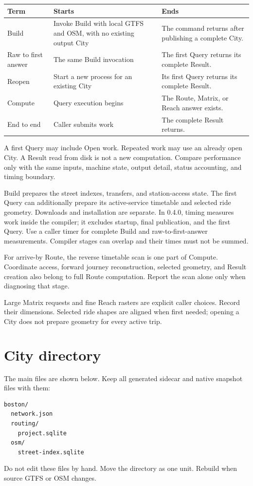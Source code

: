 \documentclass[10pt,letterpaper]{article}
\begin{document}
\begin{center}
\begin{tabularx}{\linewidth}{P{1.05in} Y Y}
\toprule
\textbf{Term} & \textbf{Starts} & \textbf{Ends} \\
\midrule
Build & Invoke Build with local GTFS and OSM, with no existing output City & The command returns after publishing a complete City. \\
Raw to first answer & The same Build invocation & The first Query returns its complete Result. \\
Reopen & Start a new process for an existing City & Its first Query returns its complete Result. \\
Compute & Query execution begins & The Route, Matrix, or Reach answer exists. \\
End to end & Caller submits work & The complete Result returns. \\
\bottomrule
\end{tabularx}
\end{center}

A first Query may include Open work. Repeated work may use an already open City. A Result read from disk is not a new computation. Compare performance only with the same inputs, machine state, output detail, status accounting, and timing boundary.

Build prepares the street indexes, transfers, and station-access state. The first Query can additionally prepare its active-service timetable and selected ride geometry. Downloads and installation are separate. In 0.4.0,  timing  measures work inside the compiler; it excludes startup, final publication, and the first Query. Use a caller timer for complete Build and raw-to-first-answer measurements. Compiler stages can overlap and their times must not be summed.

For arrive-by Route, the reverse timetable scan is one part of Compute. Coordinate access, forward journey reconstruction, selected geometry, and Result creation also belong to full Route computation. Report the scan alone only when diagnosing that stage.

Large Matrix requests and fine Reach rasters are explicit caller choices. Record their dimensions. Selected ride shapes are aligned when first needed; opening a City does not prepare geometry for every active trip.

\section{City directory}

The main files are shown below. Keep all generated sidecar and native snapshot files with them:

\begin{lstlisting}
boston/
  network.json
  routing/
    project.sqlite
  osm/
    street-index.sqlite
\end{lstlisting}

Do not edit these files by hand. Move the directory as one unit. Rebuild when source GTFS or OSM changes.
\end{document}
